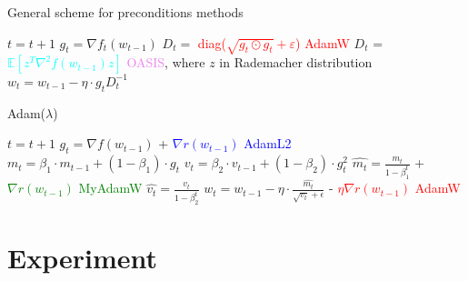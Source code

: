 \documentclass{article}
\begin{document}
\begin{algorithm}[H]
            
    \caption{General scheme for preconditions methods}\label{alg:genalg}

    \begin{algorithmic}
    \small{
    
    \State $t = t+1$
    \State $g_t = \nabla f_t(w_{t-1})$
    \State $D_t =$ \textcolor{red}{diag($\sqrt{g_t \odot g_t} + \varepsilon$)}  \hfill \textcolor{red}{AdamW}
    \State $D_t$ = \textcolor{cyan}{$\mathbb{E}[z^T \nabla^2f(w_{t-1}) z]$} \hfill \textcolor{violet}{OASIS}, where $z$ in Rademacher distribution
    \State $w_t = w_{t-1} - \eta \cdot g_t D_t^{-1}$    
    \EndWhile
    }
\end{algorithmic}
\end{algorithm}


\begin{algorithm}[H]
            
    \caption{Adam($\lambda$)}\label{alg:Adam}

    \begin{algorithmic}
    \small{
    \State $t = t+1$
    \State $g_t = \nabla f(w_{t-1})$ + \textcolor{blue}{$\nabla r(w_{t-1})$} \hfill \textcolor{blue}{AdamL2}    
    \State $m_t = \beta_1 \cdot m_{t-1} + (1 - \beta_1) \cdot g_t$
    \State $v_t = \beta_2 \cdot v_{t-1} + (1 - \beta_2) \cdot g_t^2$
    \State $\hat{m_t} = \frac{m_t}{1-\beta_1^t}$ + \textcolor{green}{$\nabla r(w_{t-1})$} \hfill \textcolor{green}{MyAdamW}
    \State $\hat{v_t} = \frac{v_t}{1-\beta_2^t}$ 
    \State $w_t = w_{t-1} - \eta \cdot \frac{\hat{m_t}}{\sqrt{v_t} + \epsilon}$    - \textcolor{red}{$\eta \nabla r(w_{t-1})$ } \hfill \textcolor{red}{AdamW}
    \EndWhile
    }
\end{algorithmic}
\end{algorithm}






\section{Experiment}
\end{document}
